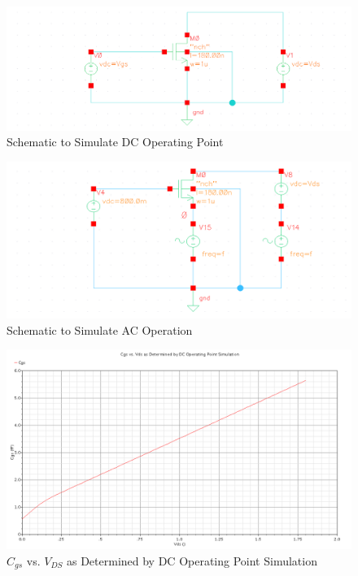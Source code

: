 \documentclass{article}
\begin{document}
\begin{figure}[H]
\centering
\includegraphics[width=7in]{1_dc_schematic.png}
\caption{Schematic to Simulate DC Operating Point}
\label{1_dc_schem}
\end{figure}

\begin{figure}[H]
\centering
\includegraphics[width=7in]{1_ac_schematic.png}
\caption{Schematic to Simulate AC Operation}
\label{1_ac_schem}
\end{figure}

\begin{figure}[H]
\centering
\includegraphics[width=5in]{1a.png}
\caption{$C_{gs}$ vs. $V_{DS}$ as Determined by DC Operating Point Simulation}
\label{1a}
\end{figure}
\end{document}
